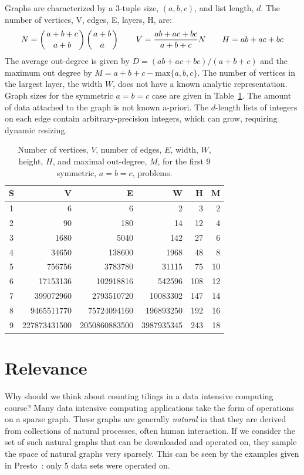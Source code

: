\documentclass{article}
\begin{document}
Graphs are characterized by a 3-tuple size, $(a,b,c)$, and list length, $d$.  The number of vertices, V, edges, E, layers, H, are:
$$ N = \left(a + b + c \atop a + b\right) \left(a + b \atop a\right) \qquad V = \frac{ab + ac + bc}{a + b + c} N \qquad H = ab + ac + bc $$
The average out-degree is given by $D = (ab + ac + bc) / (a+ b + c)$ and the maximum out degree by $M = a + b + c - \text{max}\{a,b,c\}$. The number of vertices in the largest layer, the width $W$, does not have a known analytic representation.  Graph sizes for the symmetric $a = b = c$ case are given in Table~\ref{tbl:size}. The amount of data attached to the graph is not known a-priori.  The $d$-length lists of integers on each edge contain arbitrary-precision integers, which can grow, requiring dynamic resizing. 
\begin{table}
\centering
\begin{tabular}{c | r r r r r}
S & V & E & W & H & M \\
\hline
1 & 6 & 6 & 2 & 3 & 2 \\
2 & 90 & 180 & 14 & 12 & 4 \\
3 & 1680 & 5040 & 142 & 27 & 6 \\
4 & 34650 & 138600 & 1968 & 48 & 8 \\
5 & 756756 & 3783780 & 31115 & 75 & 10 \\
6 & 17153136 & 102918816 & 542596 & 108 & 12 \\
7 & 399072960 & 2793510720 & 10083302 & 147 & 14 \\
8 & 9465511770 & 75724094160 & 196893250 & 192 & 16 \\
9 & 227873431500 & 2050860883500 & 3987935345 & 243 & 18
\end{tabular}
\caption{Number of vertices, $V$, number of edges, $E$, width, $W$, height, $H$, and maximal out-degree, $M$, for the first 9 symmetric, $a = b = c$, problems.}
\label{tbl:size}
\end{table}

\section*{Relevance}
Why should we think about counting tilings in a data intensive computing course? Many data intensive computing applications take the form of operations on a sparse graph.  These graphs are generally \textit{natural} in that they are derived from collections of natural processes, often human interaction.  If we consider the set of such natural graphs that can be downloaded and operated on, they sample the space of natural graphs very sparsely.  This can be seen by the examples given in Presto~\cite{Venkataraman2013}: only 5 data sets were operated on.
\end{document}
